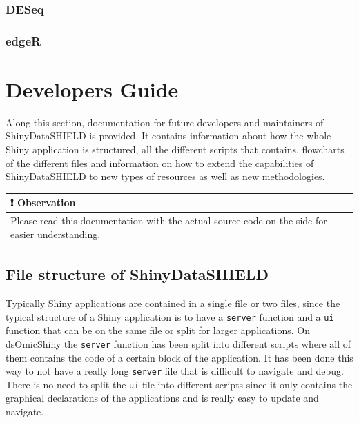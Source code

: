 \documentclass[
]{book}
\begin{document}
\hypertarget{deseq}{%
\subsection{DESeq}\label{deseq}}

\hypertarget{edger}{%
\subsection{edgeR}\label{edger}}

\hypertarget{developers-guide}{%
\chapter{Developers Guide}\label{developers-guide}}

Along this section, documentation for future developers and maintainers of ShinyDataSHIELD is provided. It contains information about how the whole Shiny application is structured, all the different scripts that contains, flowcharts of the different files and information on how to extend the capabilities of ShinyDataSHIELD to new types of resources as well as new methodologies.

\begin{longtable}[]{@{}l@{}}
\toprule
\begin{minipage}[b]{0.97\columnwidth}\raggedright
❗ Observation\strut
\end{minipage}\tabularnewline
\midrule
\endhead
\begin{minipage}[t]{0.97\columnwidth}\raggedright
Please read this documentation with the actual source code on the side for easier understanding.\strut
\end{minipage}\tabularnewline
\bottomrule
\end{longtable}

\hypertarget{file-structure-of-shinydatashield}{%
\section{File structure of ShinyDataSHIELD}\label{file-structure-of-shinydatashield}}

Typically Shiny applications are contained in a single file or two files, since the typical structure of a Shiny application is to have a \texttt{server} function and a \texttt{ui} function that can be on the same file or split for larger applications. On dsOmicShiny the \texttt{server} function has been split into different scripts where all of them contains the code of a certain block of the application. It has been done this way to not have a really long \texttt{server} file that is difficult to navigate and debug. There is no need to split the \texttt{ui} file into different scripts since it only contains the graphical declarations of the applications and is really easy to update and navigate.
\end{document}
